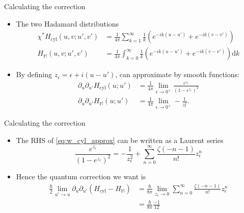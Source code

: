 \documentclass[pdf, fleqn, compress, handout]{beamer}
\begin{document}
\begin{frame}{Calculating the correction}
	\begin{itemize}
		\item	The two Hadamard distributions
				\begin{align*}
					\chi^*H_\mathrm{cyl}(u, v; u', v')
					&	=
					\frac{1}{4 \pi} \sum_{k = 1}^\infty
						\frac{1}{k} \left( 
							e^{-ik(u - u')} +
							e^{-ik(v - v')}
						 \right)
					\\
					H_\mathbb{M}(u, v; u', v')
					&	=
					\frac{1}{4 \pi} \int_{k = 0}^\infty
						\frac{1}{k} \left( 
							e^{-ik(u - u')} +
							e^{-ik(v - v')}
						 \right)
						\mathrm{d}k
				\end{align*}
		\item	By defining $z_\epsilon = \epsilon + i(u - u')$,
				can approximate by smooth functions:
				\begin{subequations}
					\begin{align}
						\label{eq:w_cyl_approx}
						\partial_u \partial_{u'}
						H_\mathrm{cyl}(u; u')
						&	=
						\frac{1}{4\pi}
						\lim_{\epsilon \to 0^+} \frac{e^{z_\epsilon}}{(1 - e^{z_\epsilon})^2}
							\\
						\partial_u \partial_{u'}
						H_\mathbb{M}(u; u')
						&	=
						\frac{1}{4\pi}
						\lim_{\epsilon \to 0^+}
							- \frac{1}{z_\epsilon^2}.
					\end{align}					
				\end{subequations}
	\end{itemize}
\end{frame}

\begin{frame}{Calculating the correction}
	\begin{itemize}
		\item	The RHS of \eqref{eq:w_cyl_approx} can be written as a Laurent series
				\begin{equation}					
					\frac{e^{z_\epsilon}}{(1 - e^{z_\epsilon})^2}
						=
					- \frac{1}{z_\epsilon^2}
					+ \sum_{n = 0}^\infty
							\frac{\zeta(-n - 1)}{n!} z_\epsilon^n
				\end{equation}
		\item	Hence the quantum correction we want is
				\begin{align*}
					\frac{\hbar}{2}
					\lim_{u' \to u}
					\partial_u \partial_{u'}
					\left(
						H_\mathrm{cyl} -
						H_\mathbb{M}
					\right)
					&	=
					\frac{\hbar}{8 \pi}
					\lim_{z_\epsilon \to 0}
						\sum_{n = 0}^\infty
							\frac{\zeta(-n - 1)}{n!} z_\epsilon^n 
						\\
					&	=
					\frac{\hbar}{8 \pi} \frac{-1}{12}
				\end{align*}
	\end{itemize}
\end{frame}
\end{document}
